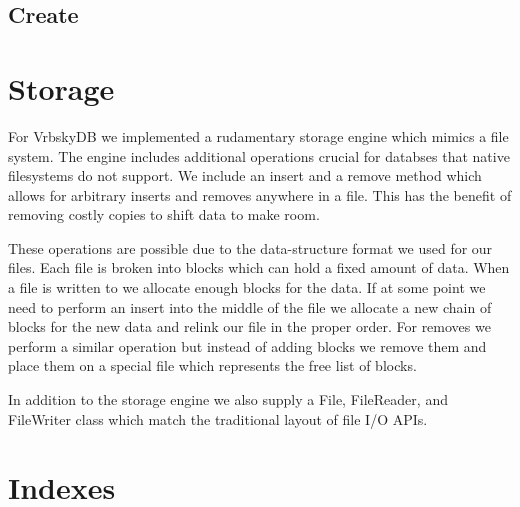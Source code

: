 \documentclass{article}
\begin{document}
\subsection{Create}

\section{Storage}

For VrbskyDB we implemented a rudamentary storage engine which mimics a file system.
The engine includes additional operations crucial for databses that native filesystems do not support.
We include an insert and a remove method which allows for arbitrary inserts and removes anywhere in a file.
This has the benefit of removing costly copies to shift data to make room.

These operations are possible due to the data-structure format we used for our files.
Each file is broken into blocks which can hold a fixed amount of data.
When a file is written to we allocate enough blocks for the data.
If at some point we need to perform an insert into the middle of the file we allocate
a new chain of blocks for the new data and relink our file in the proper order.
For removes we perform a similar operation but instead of adding blocks we remove them and 
place them on a special file which represents the free list of blocks.

In addition to the storage engine we also supply a File, FileReader, and FileWriter class which
match the traditional layout of file I/O APIs.

\section{Indexes}
\end{document}
